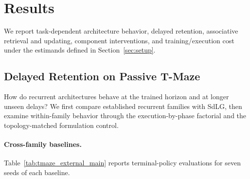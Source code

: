 \section{Results}
\label{sec:results}

We report task-dependent architecture behavior, delayed retention, associative retrieval and updating, component interventions, and training/execution cost under the estimands defined in Section~\ref{sec:setup}.

\subsection{Delayed Retention on Passive T-Maze}
\label{sec:tmaze_extrapolation}
How do recurrent architectures behave at the trained horizon and at longer unseen delays? We first compare established recurrent families with SdLG, then examine within-family behavior through the execution-by-phase factorial and the topology-matched formulation control.

\paragraph{Cross-family baselines.}
Table~\ref{tab:tmaze_external_main} reports terminal-policy evaluations for seven seeds of each baseline.

